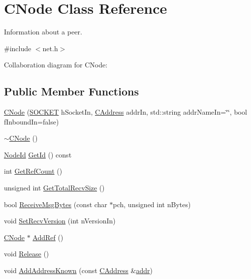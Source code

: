 \hypertarget{class_c_node}{}\section{C\+Node Class Reference}
\label{class_c_node}


Information about a peer.  




{\ttfamily \#include $<$net.\+h$>$}



Collaboration diagram for C\+Node\+:
\subsection*{Public Member Functions}
\begin{DoxyCompactItemize}
\item 
\hyperlink{class_c_node_a51556705550511146245b9fb2fec09c1}{C\+Node} (\hyperlink{compat_8h_a26ef1173e2f2c0d3db27eca28397d723}{S\+O\+C\+K\+E\+T} h\+Socket\+In, \hyperlink{class_c_address}{C\+Address} addr\+In, std\+::string addr\+Name\+In=\char`\"{}\char`\"{}, bool f\+Inbound\+In=false)
\item 
\hyperlink{class_c_node_ac9b30cb93e91a48dacc58821abfc44f0}{$\sim$\+C\+Node} ()
\item 
\hyperlink{net_8h_a954d746a58632565552615fd0a4ee660}{Node\+Id} \hyperlink{class_c_node_ac0f1a22fa938e84138536308e2001340}{Get\+Id} () const 
\item 
int \hyperlink{class_c_node_a72211aaf51af2e981e6b8a1deb73c836}{Get\+Ref\+Count} ()
\item 
unsigned int \hyperlink{class_c_node_a2cff79a034258ba032257e993fc42e62}{Get\+Total\+Recv\+Size} ()
\item 
bool \hyperlink{class_c_node_a84a10eb3aec7fdddafeb354527b50b75}{Receive\+Msg\+Bytes} (const char $\ast$pch, unsigned int n\+Bytes)
\item 
void \hyperlink{class_c_node_a94438c6285d1635c62ccff10593780e6}{Set\+Recv\+Version} (int n\+Version\+In)
\item 
\hyperlink{class_c_node}{C\+Node} $\ast$ \hyperlink{class_c_node_afb65ed679f7bda59aab89e0f5afae292}{Add\+Ref} ()
\item 
void \hyperlink{class_c_node_af804bf7c7f9794e80a3b916e1befece9}{Release} ()
\item 
void \hyperlink{class_c_node_a1d2cecdd03c9da642d292f6a81ac6ed8}{Add\+Address\+Known} (const \hyperlink{class_c_address}{C\+Address} \&\hyperlink{class_c_node_a3993ecb1de2a2135a3cf0904346a6f88}{addr})

\end{DoxyCompactItemize}
